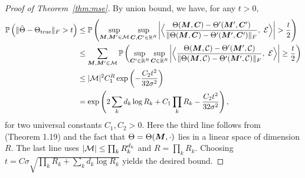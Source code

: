 \documentclass{article}
\newtheorem{lemma}{Lemma}
\begin{document}
\begin{appendices}
\begin{proof}[Proof of Theorem~\ref{thm:mse}]
By union bound, we have, for any $t>0$,
\begin{equation}
\begin{split}
\mathbb{P}\left(\FnormSize{}{\hat \Theta-\trueT} > t\right)&\leq \mathbb{P}\left(\sup_{\mM, \mM'\in \tM}\sup_{\mC, \mC'\in \mathbb{R}^R} \left|\Big\langle {\Theta(\mM,\mC)-\Theta'(\mM',\mC')\over \FnormSize{}{\Theta(\mM,\mC)-\Theta'(\mM',\mC')}}, \ \tE\Big\rangle\right|>{t\over 2}\right)\\
&\leq \sum_{\mM, \mM'\in \tM}\mathbb{P}\left(\sup_{\mC'\in \mathbb{R}^R}\sup_{\mC\in \mathbb{R}^R}\left|\Big\langle {\Theta(\mM,\tC)-\Theta'(\mM',\tC)\over \FnormSize{}{\Theta(\mM,\tC)-\Theta'(\mM',\tC)}},\ \tE\Big\rangle \right|\geq {t\over 2}\right)\\
&\leq |\tM|^2C_1^R\exp\left(-{C_2 t^2\over 32\sigma^2}\right)\\
&=\exp\left(2\sum_kd_k\log R_k+C_1\prod_k R_k-{C_2t^2\over 32\sigma^2}\right),
\end{split}
\end{equation}
for two universal constants $C_1, C_2>0$. Here the third line follows from~\cite{rigollet2015high} (Theorem 1.19) and the fact that $\Theta=\Theta(\bm M,\cdot)$ lies in a linear space of dimension $R$. The last line uses $|\mathcal{M}|\leq \prod_k R_k^{d_k}$ and $R=\prod_k R_k$. Choosing $t=C\sigma\sqrt{\prod_k R_k+\sum_k d_k\log R_k}$ yields the desired bound. 
\end{proof}



\end{appendices}
\end{document}
